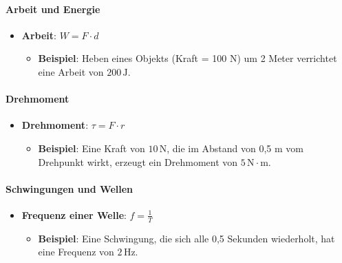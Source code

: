 \documentclass{vorlage-design-main}
\begin{document}
\hypertarget{arbeit-und-energie}{%
\paragraph{Arbeit und Energie}\label{arbeit-und-energie}}

\begin{itemize}

\item
  \textbf{Arbeit}: $W = F \cdot d$

  \begin{itemize}
  
  \item
    \textbf{Beispiel}: Heben eines Objekts (Kraft = 100 N) um 2 Meter
    verrichtet eine Arbeit von $200 \, \text{J}$.
  \end{itemize}
\end{itemize}

\hypertarget{drehmoment}{%
\paragraph{Drehmoment}\label{drehmoment}}

\begin{itemize}

\item
  \textbf{Drehmoment}: $\tau = F \cdot r$

  \begin{itemize}
  
  \item
    \textbf{Beispiel}: Eine Kraft von $10 \, \text{N}$, die im Abstand
    von 0,5 m vom Drehpunkt wirkt, erzeugt ein Drehmoment von
    $5 \, \text{N}\cdot\text{m}$.
  \end{itemize}
\end{itemize}

\hypertarget{schwingungen-und-wellen}{%
\paragraph{Schwingungen und Wellen}\label{schwingungen-und-wellen}}

\begin{itemize}

\item
  \textbf{Frequenz einer Welle}: $f = \frac{1}{T}$

  \begin{itemize}
  
  \item
    \textbf{Beispiel}: Eine Schwingung, die sich alle 0,5 Sekunden
    wiederholt, hat eine Frequenz von $2 \, \text{Hz}$.
  \end{itemize}
\end{itemize}
\end{document}
